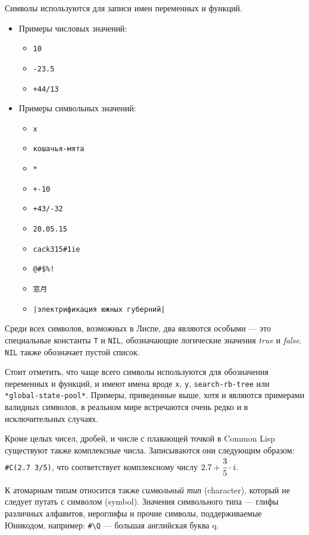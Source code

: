 \documentclass[a4paper, 12pt, titlepage, twoside]{article}
\begin{document}
Символы используются для записи имен переменных и функций.
\begin{itemize}
  \renewcommand{\labelitemii}{$\bullet$}
\item[] Примеры числовых значений:
  \begin{itemize}
  \item \verb|10|
  \item \verb|-23.5|
  \item \verb|+44/13|
  \end{itemize}
\item[] Примеры символьных значений:
  \begin{itemize}
  \item \verb|x|
  \item \verb|кошачья-мята|
  \item \verb|*|
  \item \verb|+-10|
  \item \verb|+43/-32|
  \item \texttt{20.05.15}
  \item \verb|cack315#1ie|
  \item \verb|@#$%!|
  \item \begin{CJK}{UTF8}{min}\verb|窓月|\end{CJK} %
  \item \verb#|электрификация южных губерний|#
  \end{itemize}
\end{itemize}
Среди всех символов, возможных в Лиспе, два являются особыми --- это специальные константы \verb|T| и \verb|NIL|, обозначающие логические значения \textit{true} и \textit{false}. \verb|NIL| также обозначает пустой список. 

Стоит отметить, что чаще всего символы используются для обозначения переменных и функций, и имеют имена вроде \texttt{x}, \texttt{y}, \texttt{search-rb-tree} или \texttt{*global-state-pool*}. Примеры, приведенные выше, хотя и являются примерами валидных символов, в реальном мире встречаются очень редко и в исключительных случаях.

Кроме целых чисел, дробей, и числе с плавающей точкой в Common Lisp существуют также комплексные числа. Записываются они следующим образом: \texttt{\#C(2.7 3/5)}, что соответствует комплексному числу \(2.7+\cfrac{3}{5}\cdot{}i\).

К атомарным типам относится также \textit{символьный тип} (character), который не следует путать с символом (symbol). Значения символьного типа --- глифы различных алфавитов, иероглифы и прочие символы, поддерживаемые Юникодом, например: \texttt{\#\textbackslash{}Q} --- большая английская буква q.
\end{document}
